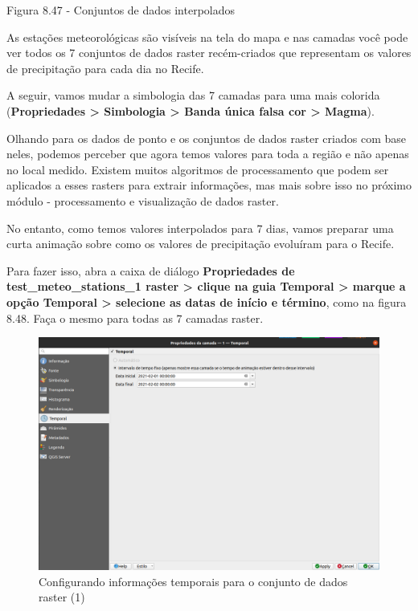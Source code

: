 \documentclass[
  portuguese,
]{krantz}
\begin{document}
Figura 8.47 - Conjuntos de dados interpolados

As estações meteorológicas são visíveis na tela do mapa e nas camadas você pode ver todos os 7 conjuntos de dados raster recém-criados que representam os valores de precipitação para cada dia no Recife.

A seguir, vamos mudar a simbologia das 7 camadas para uma mais colorida (\textbf{Propriedades \textgreater{} Simbologia \textgreater{} Banda única falsa cor \textgreater{} Magma}).

Olhando para os dados de ponto e os conjuntos de dados raster criados com base neles, podemos perceber que agora temos valores para toda a região e não apenas no local medido. Existem muitos algoritmos de processamento que podem ser aplicados a esses rasters para extrair informações, mas mais sobre isso no próximo módulo - processamento e visualização de dados raster.

No entanto, como temos valores interpolados para 7 dias, vamos preparar uma curta animação sobre como os valores de precipitação evoluíram para o Recife.

Para fazer isso, abra a caixa de diálogo \textbf{Propriedades de test\_meteo\_stations\_1 raster \textgreater{} clique na guia Temporal \textgreater{} marque a opção Temporal \textgreater{} selecione as datas de início e término}, como na figura 8.48. Faça o mesmo para todas as 7 camadas raster.

\begin{figure}
\centering
\includegraphics{media/modulo8/fig848_a.png}
\caption{Configurando informações temporais para o conjunto de dados raster (1)}
\end{figure}
\end{document}
